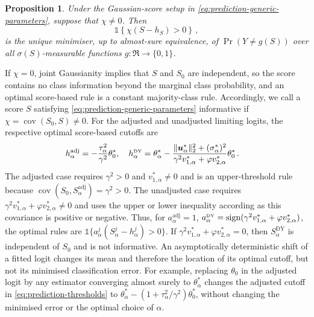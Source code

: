 \documentclass{article}
\makeatletter
\DeclareMathOperator{\sign}{sign}
\DeclareMathOperator{\cov}{cov}
\newtheorem{proposition}[theorem]{Proposition}
\theoremstyle{definition}
\newcommand{\vnorm}[1]{%
	\ensuremath{%
		\if@display
		\left\| #1 \right\|
		\else
		\| #1 \|
		\fi
	}%
}
\newcommand*{\bb}{\boldsymbol}
\def\bu{\bb{u}}
\makeatother
\begin{document}
\begin{bibunit}
\begin{proposition}
\label{prop:gaussian-score-prediction}
Under the Gaussian-score setup in
\eqref{eq:prediction-generic-parameters},
suppose that $\chi\neq0$. Then
\begin{equation}
\label{eq:prediction-optimal-score-rule}
    \mathds{1}\left\{
        \chi(S-h_S)>0
    \right\}
	\, ,
\end{equation}
is the unique minimiser, up to almost-sure equivalence, of
$
    \Pr(Y\neq g(S))
$
over all $\sigma(S)$-measurable functions $g:\Re\to\{0,1\}$. 
\end{proposition}
\noindent
If $\chi=0$, joint Gaussianity implies that $S$ and $S_0$ are independent,
so the score contains no class information beyond the marginal class
probability, and an optimal score-based rule is a constant majority-class
rule. Accordingly, we call a score $S$ satisfying
\eqref{eq:prediction-generic-parameters} informative if
$\chi=\cov(S_0,S)\neq0$.
For the adjusted and unadjusted limiting logits, the respective optimal
score-based cutoffs are
\begin{equation}
\label{eq:prediction-thresholds}
\begin{aligned}
    h_\alpha^{\textrm{adj}}
    &=
    -
    \frac{\tau_\alpha^2}{\gamma^2}
    \theta_0^*,
    \quad
    h_\alpha^{\textrm{\tiny DY}}
    =
    \theta_\alpha^*
    -
    \frac{
        \vnorm{\bu_\alpha^*}_2^2+(\sigma_\alpha^*)^2
    }{
        \gamma^2v_{1,\alpha}^*
        +\varphi v_{2,\alpha}^*
    }
    \theta_0^* \,.
\end{aligned}
\end{equation}
The adjusted case requires $\gamma^2>0$ and $v_{1,\alpha}^*\neq0$ and is an
upper-threshold rule because
$\cov(S_0,S_\alpha^{\mathrm{adj}})=\gamma^2>0$. The unadjusted case
requires
$\gamma^2v_{1,\alpha}^*+\varphi v_{2,\alpha}^*\neq0$ and uses the upper or
lower inequality according as this covariance is positive or negative. Thus,
for
$
    a_\alpha^{\textrm{adj}}
    =
    1$, $
    a_\alpha^{\textrm{\tiny DY}}
    =
    \sign(
        \gamma^2v_{1,\alpha}^*
        +\varphi v_{2,\alpha}^*
    )
$, 
the optimal rules are
$\mathds{1}\{a_\alpha^j(S_\alpha^j-h_\alpha^j)>0\}$. If
$\gamma^2v_{1,\alpha}^*+\varphi v_{2,\alpha}^*=0$, then
$S_\alpha^{\mathrm{DY}}$ is independent of $S_0$ and is not informative.
An asymptotically deterministic shift of a fitted logit changes its mean and
therefore the location of its optimal cutoff, but not its minimised
classification error. For example, replacing $\theta_0$ in the adjusted
logit by any estimator converging almost surely to $\theta_\alpha^*$ changes
the adjusted cutoff in \eqref{eq:prediction-thresholds} to
$
    \theta_\alpha^*
    -
    (
        1+\tau_\alpha^2 / {\gamma^2}
    )
    \theta_0^* 
$, 
without changing the minimised error or the optimal choice of $\alpha$. 


\end{bibunit}
\end{document}
